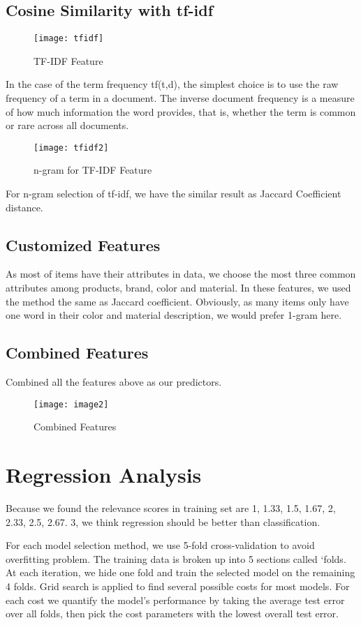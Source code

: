 \documentclass[journal]{IEEEtran}
\begin{document}
\subsection{Cosine Similarity with tf-idf}
\begin{figure}[htbp] 
\centering\texttt{[image: tfidf]} 
\caption{TF-IDF Feature}\label{fig:7} 
\end{figure} 
In the case of the term frequency tf(t,d), the simplest choice is to use the raw frequency of a term in a document. The inverse document frequency is a measure of how much information the word provides, that is, whether the term is common or rare across all documents.
\begin{figure}[htbp] 
\centering\texttt{[image: tfidf2]} 
\caption{n-gram for TF-IDF Feature}\label{fig:8} 
\end{figure} 
For n-gram selection of tf-idf, we have the similar result as Jaccard Coefficient distance.
\subsection{Customized Features}
As most of items have their attributes in data, we choose the most three common attributes among products, brand, color and material. In these features, we used the method the same as Jaccard coefficient. Obviously, as many items only have one word in their color and material description, we would prefer 1-gram here.
\subsection{Combined Features}
Combined all the features above as our predictors.
\begin{figure}[htbp] 
\centering\texttt{[image: image2]} 
\caption{Combined Features}\label{fig:9} 
\end{figure} 
\section{Regression Analysis}
Because we found the relevance scores in training set are 1, 1.33, 1.5, 1.67, 2, 2.33, 2.5, 2.67. 3, we think regression should be better than classification.

For each model selection method, we use 5-fold cross-validation to avoid overfitting problem. The training data is broken up into 5 sections called ‘folds. At each iteration, we hide one fold and train the selected model on the remaining 4 folds. Grid search is applied to find several possible costs for most models. For each cost we quantify the model’s performance by taking the average test error over all folds, then pick the cost parameters with the lowest overall test error.
\end{document}
